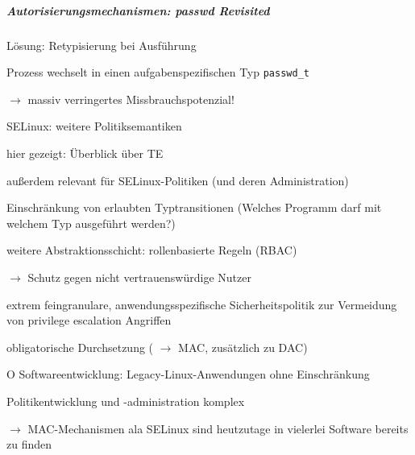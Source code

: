\documentclass[a4paper]{article}
\newcommand{\cmark}{\ding{51}}
\newcommand{\xmark}{\ding{55}}
\begin{document}
\begin{multicols}{3}
    \subparagraph{Autorisierungsmechanismen: passwd Revisited}
    \begin{itemize*}
        \item Lösung: Retypisierung bei Ausführung
        \item Prozess wechselt in einen aufgabenspezifischen Typ \texttt{passwd\_t}
        \item[$\rightarrow$] massiv verringertes Missbrauchspotenzial!
    \end{itemize*}

    SELinux: weitere Politiksemantiken
    \begin{itemize*}
        \item hier gezeigt: Überblick über TE
        \item außerdem relevant für SELinux-Politiken (und deren Administration)
        \begin{itemize*}
            \item Einschränkung von erlaubten Typtransitionen (Welches Programm darf mit welchem Typ ausgeführt werden?)
            \item weitere Abstraktionsschicht: rollenbasierte Regeln (RBAC)
            \item[$\rightarrow$] Schutz gegen nicht vertrauenswürdige Nutzer
        \end{itemize*}
        \item[\cmark] extrem feingranulare, anwendungsspezifische Sicherheitspolitik zur Vermeidung von privilege escalation Angriffen
        \item[\cmark] obligatorische Durchsetzung ( $\rightarrow$ MAC, zusätzlich zu DAC)
        \item[O] Softwareentwicklung: Legacy-Linux-Anwendungen ohne Einschränkung
        \item[\xmark] Politikentwicklung und -administration komplex
        \item[$\rightarrow$] MAC-Mechanismen ala SELinux sind heutzutage in vielerlei Software bereits zu finden
    \end{itemize*}


\end{multicols}
\end{document}

